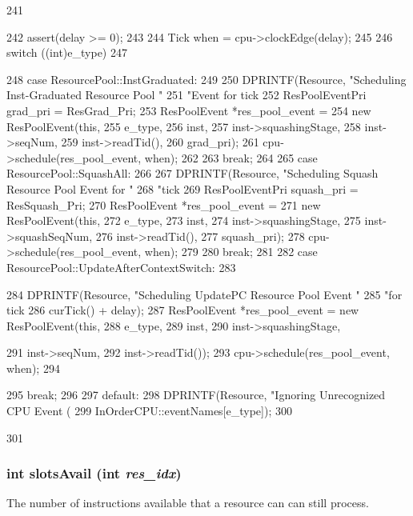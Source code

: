 \begin{DoxyCode}
241 {
242     assert(delay >= 0);
243 
244     Tick when = cpu->clockEdge(delay);
245 
246     switch ((int)e_type)
247     {
248       case ResourcePool::InstGraduated:
249         {
250             DPRINTF(Resource, "Scheduling Inst-Graduated Resource Pool "
251                     "Event for tick %
252             ResPoolEventPri grad_pri = ResGrad_Pri;
253             ResPoolEvent *res_pool_event = 
254                 new ResPoolEvent(this,
255                                  e_type,
256                                  inst,
257                                  inst->squashingStage,
258                                  inst->seqNum,
259                                  inst->readTid(),
260                                  grad_pri);
261             cpu->schedule(res_pool_event, when);
262         }
263         break;
264 
265       case ResourcePool::SquashAll:
266         {
267             DPRINTF(Resource, "Scheduling Squash Resource Pool Event for "
268                     "tick %
269             ResPoolEventPri squash_pri = ResSquash_Pri;
270             ResPoolEvent *res_pool_event = 
271                 new ResPoolEvent(this,
272                                  e_type,
273                                  inst,
274                                  inst->squashingStage,
275                                  inst->squashSeqNum,
276                                  inst->readTid(),
277                                  squash_pri);
278             cpu->schedule(res_pool_event, when);
279         }
280         break;
281 
282       case ResourcePool::UpdateAfterContextSwitch:
283         {
284             DPRINTF(Resource, "Scheduling UpdatePC Resource Pool Event "
285                     "for tick %
286                     curTick() + delay);
287             ResPoolEvent *res_pool_event = new ResPoolEvent(this,
288                                                             e_type,
289                                                             inst,
290                                                             inst->squashingStage,
      
291                                                             inst->seqNum,
292                                                             inst->readTid());
293             cpu->schedule(res_pool_event, when);
294         }
295         break;
296 
297       default:
298         DPRINTF(Resource, "Ignoring Unrecognized CPU Event (%
299                 InOrderCPU::eventNames[e_type]);
300     }
301 }
\end{DoxyCode}
\hypertarget{classResourcePool_acbd2796a939e932960eb09ec21ce3c3b}{
\subsubsection[{slotsAvail}]{\setlength{\rightskip}{0pt plus 5cm}int slotsAvail (int {\em res\_\-idx})}}
\label{classResourcePool_acbd2796a939e932960eb09ec21ce3c3b}
The number of instructions available that a resource can can still process. 


